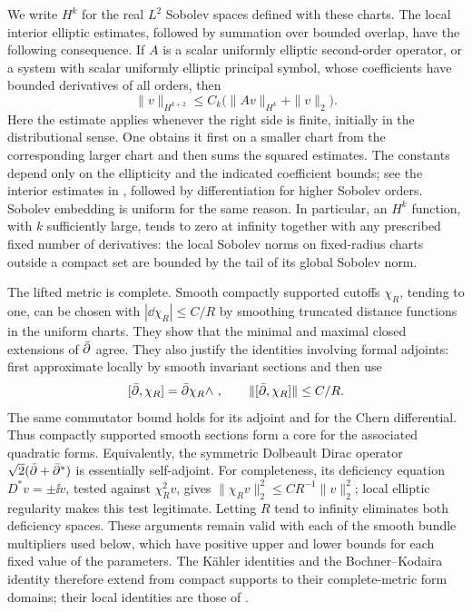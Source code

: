 We write $H^k$ for the real $L^2$ Sobolev spaces defined with these charts.
The local interior elliptic estimates, followed by summation over bounded
overlap, have the following consequence.  If $A$ is a scalar uniformly
elliptic second-order operator, or a system with scalar uniformly elliptic
principal symbol, whose coefficients have bounded derivatives of all
orders, then
\begin{equation}\label{sp:global-elliptic}
 \|v\|_{H^{k+2}}
 \le C_k\bigl(\|Av\|_{H^k}+\|v\|_2\bigr).
\end{equation}
Here the estimate applies whenever the right side is finite, initially in
the distributional sense.  One obtains it first on a smaller chart from
the corresponding larger chart and then sums the squared estimates.
The constants depend only on the ellipticity and the indicated coefficient
bounds; see the interior estimates in
\cite[Theorems~6.2 and~9.11]{GilbargTrudinger2001}, followed by
differentiation for higher Sobolev orders.
Sobolev embedding is uniform for the same reason.  In particular, an
$H^k$ function, with $k$ sufficiently large, tends to zero at infinity
together with any prescribed fixed number of derivatives: the local
Sobolev norms on fixed-radius charts outside a compact set are bounded by
the tail of its global Sobolev norm.

The lifted metric is complete.  Smooth compactly supported cutoffs
$\chi_R$, tending to one, can be chosen with
$|\dd\chi_R|\le C/R$ by smoothing truncated distance functions in the
uniform charts.  They show that the minimal and maximal closed extensions
of $\bar\partial$ agree.  They also justify the identities involving formal
adjoints: first approximate locally by smooth invariant sections and then
use
\[
 [\bar\partial,\chi_R]=\bar\partial\chi_R\wedge\ ,
 \qquad
 \|[\bar\partial,\chi_R]\|\le C/R.
\]
The same commutator bound holds for its adjoint and for the Chern
differential.  Thus compactly supported smooth sections form a core for
the associated quadratic forms.  Equivalently, the symmetric Dolbeault
Dirac operator $\sqrt2(\bar\partial+\bar\partial^*)$ is essentially self-adjoint.  For
completeness, its deficiency equation $D^*v=\pm\ii v$, tested against
$\chi_R^2v$, gives
$\|\chi_Rv\|_2^2\le C R^{-1}\|v\|_2^2$; local elliptic regularity
makes this test legitimate.  Letting $R$ tend to infinity eliminates both
deficiency spaces.  These arguments remain valid with each of the smooth
bundle multipliers used below, which have positive upper and lower bounds
for each fixed value of the parameters.  The K\"ahler identities
and the Bochner--Kodaira identity therefore extend from compact supports
to their complete-metric form domains; their local identities are those
of \cite[Chapter~VI, Section~6, and Chapter~VII, Theorems~1.1--1.2]{DemaillyCADG}.

